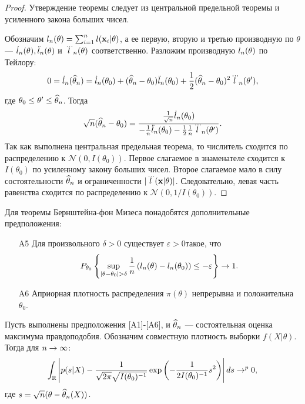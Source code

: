 \begin{proof}
Утверждение теоремы следует из центральной предельной теоремы и усиленного закона больших чисел. 

Обозначим $l_n(\theta) = \sum_{i = 1}^{n} l(\mathbf{x}_i | \theta)$,
а ее первую, вторую и третью производную по $\theta$ --- $\dot{l}_n(\theta), \ddot{l}_n(\theta)$ и $\dddot{l}_n(\theta)$ соответственно.
Разложим производную $l_n(\theta)$ по Тейлору:
\[
0 = \dot{l}_{n}(\widehat{\theta}_n) = \dot{l}_{n}(\theta_0) + (\widehat{\theta}_n - \theta_0) \ddot{l}_{n}(\theta_0) + \frac12 (\widehat{\theta}_n - \theta_0)^2 \dddot{l}_{n}(\theta'),
\]
где $\theta_0 \leq \theta' \leq \widehat{\theta}_n$.
Тогда
\[
\sqrt{n} (\widehat{\theta}_n - \theta_0) = \frac{\frac{1}{\sqrt{n}} \dot{l}_{n}(\theta_0)}{-\frac{1}{n} \ddot{l}_{n}(\theta_0) - \frac12 \frac{1}{n} \dddot{l}_{n}(\theta')}. 
\]
Так как выполнена центральная предельная теорема, то числитель сходится по распределению к $\mathcal{N}(0, I(\theta_0))$.
Первое слагаемое в знаменателе сходится к $I(\theta_0)$ по усиленному закону больших чисел.
Второе слагаемое мало в силу состоятельности $\widehat{\theta}_n$ и ограниченности $|\dddot{l}(\mathbf{x} | \theta)|$.
Следовательно, левая часть равенства сходится по распределению к 
$\mathcal{N}(0, 1 / I(\theta_0))$.
\end{proof}

Для теоремы Бернштейна-фон Мизеса понадобятся дополнительные предположения:
\begin{itemize}
	\item[A5] Для произвольного $\delta > 0$ существует $\varepsilon > 0$такое, что
	\[
	P_{\theta_0} \left\{ \sup_{|\theta - \theta_0| > \delta} \frac{1}{n} \left( l_n(\theta) - l_n(\theta_0) \right) \leq -\varepsilon \right\} \rightarrow 1.
	\]
	\item[A6] Априорная плотность распределения $\pi(\theta)$ непрерывна и положительна $\theta_0$.
\end{itemize}

\begin{Theorem}
Пусть выполнены предположения [A1]-[A6], и $\widehat{\theta}_n$ --- состоятельная оценка максимума правдоподобия.
Обозначим совместную плотность выборки $f(X| \theta)$.
Тогда для $n \rightarrow \infty$:
\[
\int_{\mathbb{R}} \left|p(s | X) - \frac{1}{\sqrt{2\pi}\sqrt{I(\theta_0)^{-1}}} \exp \left(-\frac{1}{2 I(\theta_0)^{-1}} s^2 \right) \right| ds \rightarrow^{p} 0,
\]
где $s = \sqrt{n} (\theta - \widehat{\theta}_n(X))$.
\end{Theorem}

